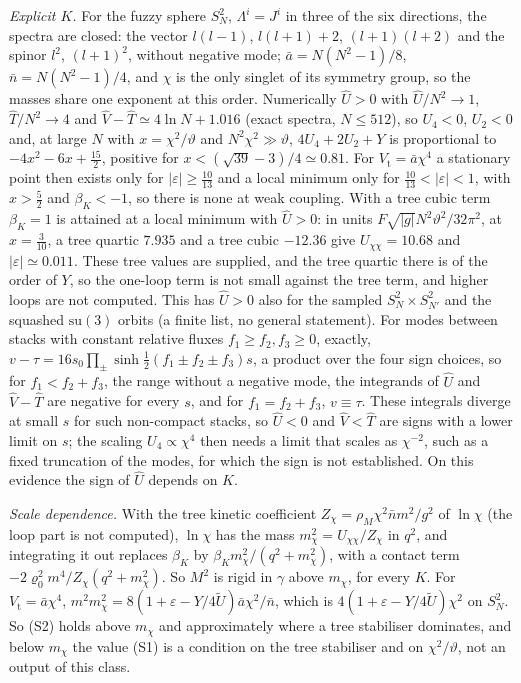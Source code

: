\emph{Explicit \(K\).} For the fuzzy sphere \(S^2_N\), \(\Lambda^i=J^i\) in three of the six directions, the spectra are closed: the vector \(l(l-1)\), \(l(l+1)+2\), \((l+1)(l+2)\) and the spinor \(l^2\), \((l+1)^2\), without negative mode; \(\bar a=N(N^2-1)/8\), \(\bar n=N(N^2-1)/4\), and \(\chi\) is the only singlet of its symmetry group, so the masses share one exponent at this order. Numerically \(\hat U>0\) with \(\hat U/N^2\to1\), \(\hat T/N^2\to4\) and \(\hat V-\hat T\simeq4\ln N+1.016\) (exact spectra, \(N\le512\)), so \(U_4<0\), \(U_2<0\) and, at large \(N\) with \(x=\chi^2/\vartheta\) and \(N^2\chi^2\gg\vartheta\), \(4U_4+2U_2+Y\) is proportional to \(-4x^2-6x+\tfrac{15}2\), positive for \(x<(\sqrt{39}-3)/4\simeq0.81\). For \(V_{\mathrm t}=\bar a\chi^4\) a stationary point then exists only for \(|\varepsilon|\ge\tfrac{10}{13}\) and a local minimum only for \(\tfrac{10}{13}<|\varepsilon|<1\), with \(x>\tfrac52\) and \(\beta_K<-1\), so there is none at weak coupling. With a tree cubic term \(\beta_K=1\) is attained at a local minimum with \(\hat U>0\): in units \(F\sqrt{|g|}N^2\vartheta^2/32\pi^2\), at \(x=\tfrac3{10}\), a tree quartic \(7.935\) and a tree cubic \(-12.36\) give \(U_{\chi\chi}=10.68\) and \(|\varepsilon|\simeq0.011\). These tree values are supplied, and the tree quartic there is of the order of \(Y\), so the one-loop term is not small against the tree term, and higher loops are not computed. This has \(\hat U>0\) also for the sampled \(S^2_N\times S^2_{N'}\) and the squashed \(\mathrm{su}(3)\) orbits (a finite list, no general statement). For modes between stacks with constant relative fluxes \(f_1\ge f_2,f_3\ge0\), exactly, \(v-\tau=16s_0\prod_\pm\sinh\tfrac12(f_1\pm f_2\pm f_3)s\), a product over the four sign choices, so for \(f_1<f_2+f_3\), the range without a negative mode, the integrands of \(\hat U\) and \(\hat V-\hat T\) are negative for every \(s\), and for \(f_1=f_2+f_3\), \(v\equiv\tau\). These integrals diverge at small \(s\) for such non-compact stacks, so \(\hat U<0\) and \(\hat V<\hat T\) are signs with a lower limit on \(s\); the scaling \(U_4\propto\chi^4\) then needs a limit that scales as \(\chi^{-2}\), such as a fixed truncation of the modes, for which the sign is not established. On this evidence the sign of \(\hat U\) depends on \(K\).

\emph{Scale dependence.} With the tree kinetic coefficient \(Z_\chi=\rho_M\chi^2\bar nm^2/g^2\) of \(\ln\chi\) (the loop part is not computed), \(\ln\chi\) has the mass \(m_\chi^2=U_{\chi\chi}/Z_\chi\) in \(q^2\), and integrating it out replaces \(\beta_K\) by \(\beta_Km_\chi^2/(q^2+m_\chi^2)\), with a contact term \(-2\varrho_0^2m^4/Z_\chi(q^2+m_\chi^2)\). So \(M^2\) is rigid in \(\gamma\) above \(m_\chi\), for every \(K\). For \(V_{\mathrm t}=\bar a\chi^4\), \(m^2m_\chi^2=8(1+\varepsilon-Y/4\tilde U)\bar a\chi^2/\bar n\), which is \(4(1+\varepsilon-Y/4\tilde U)\chi^2\) on \(S^2_N\). So (S2) holds above \(m_\chi\) and approximately where a tree stabiliser dominates, and below \(m_\chi\) the value (S1) is a condition on the tree stabiliser and on \(\chi^2/\vartheta\), not an output of this class.

